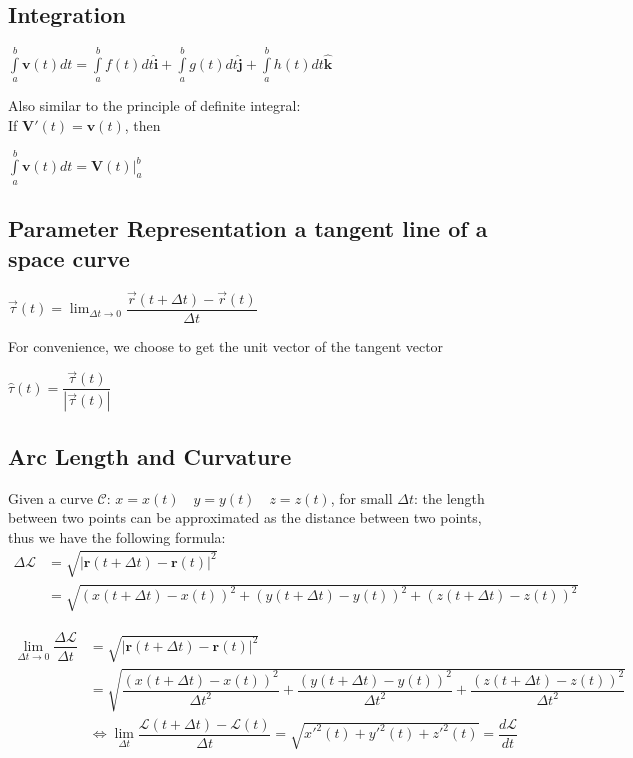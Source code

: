 \documentclass[UTF8,a4paper, 10pt, openany]{svmono}
\begin{document}
\subsection{Integration}
\begin{center}
$\displaystyle\int\limits_a^b \mathbf{v}(t)dt=\displaystyle\int\limits_a^b f(t)dt \mathbf{\hat{i}}+\displaystyle\int\limits_a^b g(t)dt \mathbf{\hat{j}}+\displaystyle\int\limits_a^b h(t)dt \mathbf{\hat{k}}$
\end{center}
Also similar to the principle of definite integral:\\
If $\mathbf{V}'(t)=\mathbf{v}(t)$, then
\begin{center}
$\displaystyle\int\limits_a^b \mathbf{v}(t)dt=\mathbf{V}(t) |_{a}^b$
\end{center}
\subsection{Parameter Representation a tangent line of a space curve}
\begin{center}
$\overrightarrow{\tau}(t)=\displaystyle\lim_{\Delta t\to 0}\dfrac{\overrightarrow{r}(t+\Delta t)-\overrightarrow{r}(t)}{\Delta t} $
\end{center}
For convenience, we choose to get the unit vector of the tangent vector \\
\begin{center}
$\hat{\tau }(t)=\dfrac{\overrightarrow{\tau }(t)}{|\overrightarrow{\tau }(t)|}$
\end{center}

\subsection{Arc Length and Curvature}
Given a curve $\mathcal{C}$: $x=x(t)\quad y=y(t)\quad z=z(t)$, for small $\Delta t$: the length between two points can be approximated as the distance between two points, thus we have the following formula:
\begin{align*}
\Delta\mathcal{L} & = \sqrt{|\mathbf{r}(t+\Delta t)-\mathbf{r}(t)|^2}\\
& =\sqrt{(x(t+\Delta t)-x(t))^2+(y(t+\Delta t)-y(t))^2+(z(t+\Delta t)-z(t))^2}
\end{align*}

\begin{align*}
\lim_{\Delta t \to 0}\dfrac{\Delta\mathcal{L}}{\Delta t} &= \sqrt{|\mathbf{r}(t+\Delta t)-\mathbf{r}(t)|^2}	\\
&= \sqrt{\dfrac{(x(t+\Delta t)-x(t))^2}{\Delta t^2}+\dfrac{(y(t+\Delta t)-y(t))^2}{\Delta t^2}+\dfrac{(z(t+\Delta t)-z(t))^2}{\Delta t^2}}		\\
&\iff \displaystyle\lim_{\Delta t}\dfrac{\mathcal{L}(t+\Delta t)-\mathcal{L}(t)}{\Delta t}=\sqrt{x'^2(t)+y'^2(t)+z'^2(t)}=\dfrac{d\mathcal{L}}{dt}
\end{align*}
\end{document}

